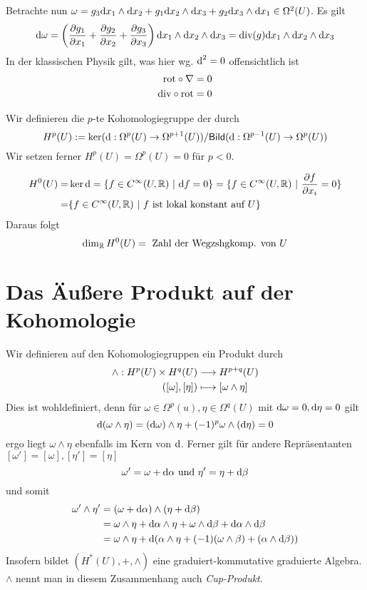 Betrachte nun $\omega = g_3 \text{d} x_1 \wedge \text{d} x_2+ g_1 \text{d} x_2 \wedge \text{d} x_3 +  g_2 \text{d} x_3 \wedge \text{d} x_1\in \Omega^2(U)$. Es gilt
\[ \text{d} \omega = \left( \frac{\partial g_1}{\partial x_1} + \frac{\partial g_2}{\partial x_2 } + \frac{\partial g_3}{\partial x_3} \right) \text{d} x_1 \wedge \text{d} x_2 \wedge \text{d} x_3 = \text{div}(g)  \text{d} x_1 \wedge \text{d} x_2 \wedge \text{d} x_3  \]
In der klassischen Physik gilt, was hier wg. $\text{d}^2 = 0$ offensichtlich ist
\begin{align*}
\text{rot} \circ \nabla &= 0\\
\text{div} \circ \text{rot} &= 0
\end{align*}

\Def{}
Wir definieren die $p$-te Kohomologiegruppe der  durch
\[ H^p(U) := \ker (\text{d} : \Omega^p(U) \overset{}{\rightarrow} \Omega^{p+1} (U)) / \textsf{Bild}(\text{d} : \Omega^{p-1}(U) \overset{}{\rightarrow} \Omega^p(U) ) \]
Wir setzen ferner $H^p(U) = \Omega^p(U) = 0$ für $p < 0$.

\Bem{}
\begin{align*}
 H^0(U) =& \ker \text{d} = \{f \in C^\infty (U,\mathbb{R})~|~\text{d} f = 0\} =  \{f \in C^\infty (U,\mathbb{R})~|~ \frac{\partial f}{\partial x_i} = 0 \}\\
  =& \{f \in C^\infty (U,\mathbb{R})~|~ f\text{ ist lokal konstant auf }U \}
\end{align*}
Daraus folgt
\[ \dim_{\mathbb{R}} H^0(U) = \text{ Zahl der Wegzshgkomp. von }U \]

\section{Das Äußere Produkt auf der Kohomologie}
\Def{}
Wir definieren auf den Kohomologiegruppen ein Produkt durch
\begin{align*}
\wedge : H^p(U) \times H^q(U) & \overset{}{\longrightarrow} H^{p+q}(U)\\
([\omega], [\eta]) & \longmapsto [\omega\wedge \eta]
\end{align*}
Dies ist wohldefiniert, denn für $\omega\in \Omega^p(u), \eta\in \Omega^q(U)$ mit $\text{d} \omega = 0, \text{d} \eta = 0$ gilt
\[ \text{d} (\omega \wedge \eta) = (\text{d} \omega) \wedge \eta + (-1)^p \omega \wedge (\text{d} \eta) = 0 \]
ergo liegt $\omega \wedge \eta$ ebenfalls im Kern von $\text{d}$. Ferner gilt für andere Repräsentanten $[\omega'] = [\omega], [\eta'] = [\eta]$
\[ \omega' = \omega + \text{d} \alpha \text{ und }\eta' = \eta + \text{d} \beta \]
und somit
\begin{align*}
\omega'\wedge \eta' &= (\omega + \text{d} \alpha)\wedge (\eta + \text{d} \beta) \\
&= \omega \wedge \eta + \text{d} \alpha \wedge \eta + \omega \wedge \text{d} \beta + \text{d} \alpha \wedge \text{d} \beta\\
 &= \omega \wedge \eta + \text{d}(\alpha \wedge \eta + (-1)(\omega \wedge \beta) + (\alpha\wedge \text{d} \beta) )
\end{align*}
Insofern bildet $(H^*(U), +, \wedge)$ eine graduiert-kommutative graduierte Algebra. $\wedge$ nennt man in diesem Zusammenhang auch \textit{Cup-Produkt}.

